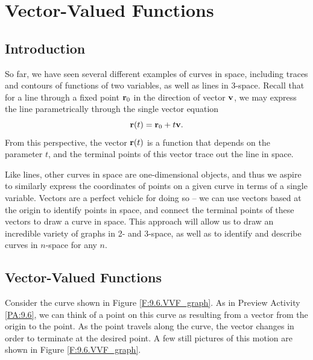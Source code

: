 \section{Vector-Valued Functions} \label{S:9.6.Vector_Valued_Functions}

\vspace*{-14 pt}

\subsection*{Introduction}

So far, we have seen several different examples of curves in space,
including traces and contours of functions of two variables, as well
as lines in 3-space.  Recall that for a line through a fixed point
$\mathbf{r}_0$ in the direction of vector $\mathbf{v}$, we may express the line
parametrically through the single vector equation
$$\mathbf{r}(t) = \mathbf{r}_0 + t\mathbf{v}.$$
From this perspective, the vector $\mathbf{r}(t)$ is a function that depends
on the parameter $t$, and the terminal points of this vector trace out
the line in space.

Like lines, other curves in space are one-dimensional objects, and
thus we aspire to similarly express the coordinates of points on a
given curve in terms of a single variable.  Vectors are a perfect
vehicle for doing so -- we can use vectors based at the origin to
identify points in space, and connect the terminal points of these
vectors to draw a curve in space.  This approach will allow us to draw
an incredible variety of graphs in 2- and 3-space, as well as to
identify and describe curves in $n$-space for any $n$.



\subsection*{Vector-Valued Functions}

Consider the curve shown in Figure \ref{F:9.6.VVF_graph}. As in
Preview Activity \ref{PA:9.6}, we can think of a point on this curve
as resulting from a vector from the origin to the point. As the point
travels along the curve, the vector changes in order to terminate at
the desired point. %
A few still pictures of this motion are shown in Figure \ref{F:9.6.VVF_graph}.

